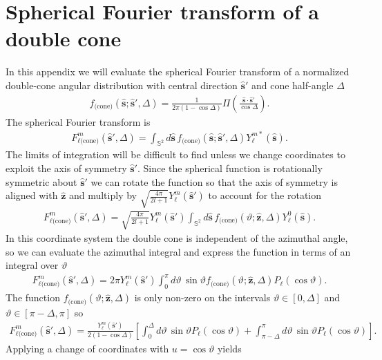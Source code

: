 \documentclass[]{osa-article}
\providecommand{\mh}[1]{\mathbf{\hat{#1}}}
\providecommand{\mbb}[1]{\mathbb{#1}}
\begin{document}
\section{Spherical Fourier transform of a double cone}\label{sec:cone}
In this appendix we will evaluate the spherical Fourier transform of a
normalized double-cone angular distribution with central direction $\mh{s}'$ and
cone half-angle $\Delta$
\begin{align}
  f_{\text{(cone)}}(\mh{s}; \mh{s}', \Delta) = \frac{1}{2\pi(1 - \cos\Delta)}\Pi\left(\frac{\mh{s}\cdot\mh{s}'}{\cos\Delta}\right). 
\end{align}
The spherical Fourier transform is
\begin{align}
  F_{\ell\text{(cone)}}^m(\mh{s}', \Delta) = \int_{\mbb{S}^2}d\mh{s}\, f_{\text{(cone)}}(\mh{s}; \mh{s}', \Delta)Y_\ell^{m*}(\mh{s}).
\end{align}
The limits of integration will be difficult to find unless we change coordinates
to exploit the axis of symmetry $\mh{s}'$. Since the spherical function is
rotationally symmetric about $\mh{s}'$ we can rotate the function so that the axis of
symmetry is aligned with $\mh{z}$ and multiply by $\sqrt{\frac{4\pi}{2l+1}}Y_\ell^m(\mh{s}')$ to account for the rotation
\begin{align}
    F_{\ell\text{(cone)}}^m(\mh{s}', \Delta) = \sqrt{\frac{4\pi}{2l+1}}Y_\ell^m(\mh{s}')\int_{\mbb{S}^2}d\mh{s}\, f_{\text{(cone)}}(\vartheta; \mh{z}, \Delta)Y_\ell^0(\mh{s}). 
\end{align}
In this coordinate system the double cone is independent of the azimuthal angle,
so we can evaluate the azimuthal integral and express the function in terms of an
integral over
$\vartheta$
\begin{align}
    F_{\ell\text{(cone)}}^m(\mh{s}', \Delta) = 2\pi Y_\ell^m(\mh{s}')\int_{0}^\pi d\vartheta\, \sin\vartheta f_{\text{(cone)}}(\vartheta; \mh{z}, \Delta)P_\ell(\cos\vartheta). 
\end{align}
The function $f_{\text{(cone)}}(\vartheta; \mh{z}, \Delta)$ is only non-zero on
the intervals $\vartheta \in [0, \Delta]$ and
$\vartheta \in [\pi - \Delta, \pi]$ so
\begin{align}
    F_{\ell\text{(cone)}}^m(\mh{s}', \Delta) = \frac{Y_\ell^m(\mh{s}')}{2(1 - \cos\Delta)}\left[\int_{0}^\Delta d\vartheta\, \sin\vartheta P_\ell(\cos\vartheta) + \int_{\pi - \Delta}^\pi d\vartheta\, \sin\vartheta P_\ell(\cos\vartheta)\right]. 
\end{align}
Applying a change of coordinates with $u = \cos\vartheta$ yields
\end{document}
